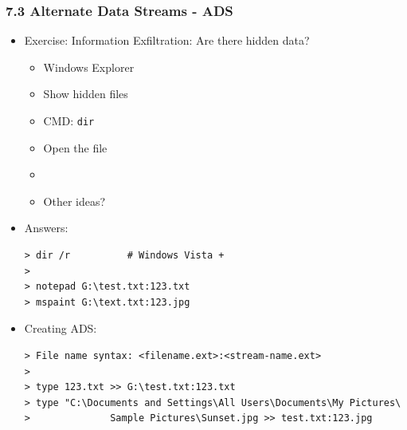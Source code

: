 \begin{frame}[fragile]
  \frametitle{7.3 Alternate Data Streams - ADS}
    \begin{itemize}
       \item Exercise: Information Exfiltration: Are there hidden data?
            \begin{itemize}
                \item Windows Explorer
                \item Show hidden files
                \item CMD: \texttt{dir}
                \item Open the file
                \item
                \item Other ideas?
            \end{itemize}
       \item Answers:
  \begin{lstlisting}[basicstyle=\tiny]
> dir /r          # Windows Vista +
>
> notepad G:\test.txt:123.txt
> mspaint G:\text.txt:123.jpg
  \end{lstlisting}
       \item Creating ADS:
  \begin{lstlisting}[basicstyle=\tiny]
> File name syntax: <filename.ext>:<stream-name.ext>
>
> type 123.txt >> G:\test.txt:123.txt
> type "C:\Documents and Settings\All Users\Documents\My Pictures\
>              Sample Pictures\Sunset.jpg >> test.txt:123.jpg
  \end{lstlisting}
    \end{itemize}
\end{frame}







